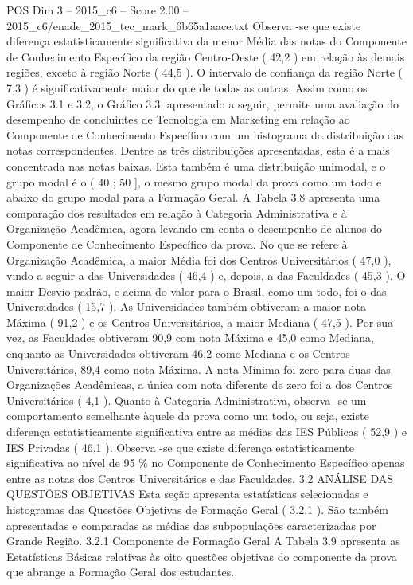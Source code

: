 \begin{textsample}{POS Dim 3 – 2015\_c6 – Score 2.00 – 2015\_c6/enade\_2015\_tec\_mark\_6b65a1aace.txt}
Observa -se que existe diferença estatisticamente significativa da menor Média das notas do Componente de Conhecimento Específico da região Centro-Oeste ( 42,2 ) em relação às demais regiões, exceto à região Norte ( 44,5 ).
O intervalo de confiança da região Norte ( 7,3 ) é significativamente maior do que de todas as outras.
Assim como os Gráficos 3.1 e 3.2, o Gráfico 3.3, apresentado a seguir, permite uma avaliação do desempenho de concluintes de Tecnologia em Marketing em relação ao Componente de Conhecimento Específico com um histograma da distribuição das notas correspondentes.
Dentre as três distribuições apresentadas, esta é a mais concentrada nas notas baixas.
Esta também é uma distribuição unimodal, e o grupo modal é o ( 40 ; 50 ], o mesmo grupo modal da prova como um todo e abaixo do grupo modal para a Formação Geral.
A Tabela 3.8 apresenta uma comparação dos resultados em relação à Categoria Administrativa e à Organização Acadêmica, agora levando em conta o desempenho de alunos do Componente de Conhecimento Específico da prova.
No que se refere à Organização Acadêmica, a maior Média foi dos Centros Universitários ( 47,0 ), vindo a seguir a das Universidades ( 46,4 ) e, depois, a das Faculdades ( 45,3 ).
O maior Desvio padrão, e acima do valor para o Brasil, como um todo, foi o das Universidades ( 15,7 ).
As Universidades também obtiveram a maior nota Máxima ( 91,2 ) e os Centros Universitários, a maior Mediana ( 47,5 ).
Por sua vez, as Faculdades obtiveram 90,9 com nota Máxima e 45,0 como Mediana, enquanto as Universidades obtiveram 46,2 como Mediana e os Centros Universitários, 89,4 como nota Máxima.
A nota Mínima foi zero para duas das Organizações Acadêmicas, a única com nota diferente de zero foi a dos Centros Universitários ( 4,1 ).
Quanto à Categoria Administrativa, observa -se um comportamento semelhante àquele da prova como um todo, ou seja, existe diferença estatisticamente significativa entre as médias das IES Públicas ( 52,9 ) e IES Privadas ( 46,1 ).
Observa -se que existe diferença estatisticamente significativa ao nível de 95 \% no Componente de Conhecimento Específico apenas entre as notas dos Centros Universitários e das Faculdades. 3.2 ANÁLISE DAS QUESTÕES OBJETIVAS Esta seção apresenta estatísticas selecionadas e histogramas das Questões Objetivas de Formação Geral ( 3.2.1 ).
São também apresentadas e comparadas as médias das subpopulações caracterizadas por Grande Região. 3.2.1 Componente de Formação Geral A Tabela 3.9 apresenta as Estatísticas Básicas relativas às oito questões objetivas do componente da prova que abrange a Formação Geral dos estudantes.

\end{textsample}
